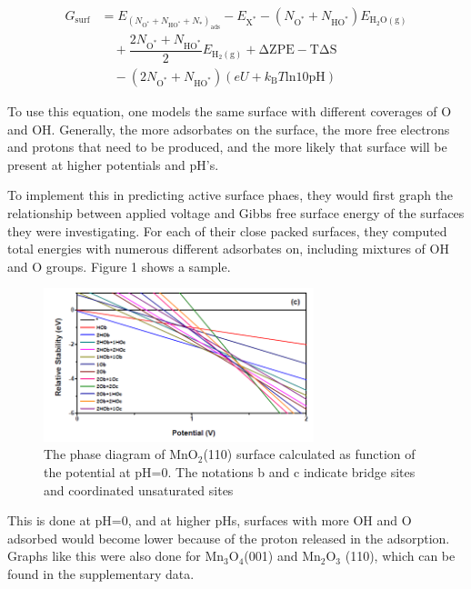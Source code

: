 \documentclass[11pt]{article}
\begin{document}
   \begin{equation}
   \begin{split}
   G_{\mathrm{surf}} &= E_{(N_{\mathrm{O^\ast}} + N_{\mathrm{HO^\ast}} + N_\ast)_{\mathrm{ads}}} - E_{\mathrm{X^{\ast}}} -
   (N_{\mathrm{O^\ast}} + N_{\mathrm{HO^\ast}}) E_{\mathrm{H_2O(g)}} \\ 
   &\quad + \dfrac{2N_{\mathrm{O^\ast}} +
   N_{\mathrm{HO^\ast}}}{2} E_{\mathrm{H_2(g)}} + \mathrm{\Delta ZPE -
   T\Delta S} \\
   &\quad - (2N_{\mathrm{O^\ast}} + N_{\mathrm{HO^\ast}})(eU +
   k_\mathrm{B}T\mathrm{ln}10\mathrm{pH})
   \end{split}
   \end{equation}
   
   To use this equation, one models the same surface with different
   coverages of O and OH. Generally, the more adsorbates on the surface,
   the more free electrons and protons that need to be produced, and the
   more likely that surface will be present at higher potentials and
   pH's.

   To implement this in predicting active surface phaes, they would
   first graph the relationship between applied voltage and Gibbs free
   surface energy of the surfaces they were investigating. 
   For each of their close packed surfaces, they computed total
   energies with numerous different adsorbates on, including mixtures 
   of OH and O groups.
   Figure 1 shows a sample.

   \begin{figure}[H]
   \centering
   \includegraphics[width=0.7\textwidth]{./rossmeisl-sample.png}
   \caption{\label{fig:constant-pH-free-energy}The phase diagram of MnO$_{2}$(110) surface calculated as function of the potential at pH=0. The notations b and c indicate bridge sites and coordinated unsaturated sites}
   \end{figure}

   This is done at pH=0, and at higher pHs, surfaces with more OH and
   O adsorbed would become lower because of the proton released in the
   adsorption.
   Graphs like this were also done for Mn$_{3}$O$_{4}$(001) and
   Mn$_{2}$O$_{3}$ (110), which can be found in the supplementary data.
\end{document}
